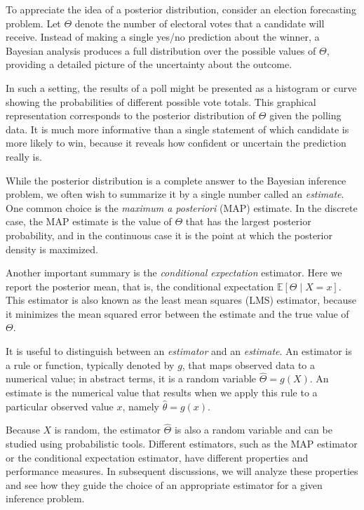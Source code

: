 To appreciate the idea of a posterior distribution, consider an election forecasting problem.  
Let \(\Theta\) denote the number of electoral votes that a candidate will receive.  
Instead of making a single yes/no prediction about the winner, a Bayesian analysis produces a full distribution over the possible values of \(\Theta\), providing a detailed picture of the uncertainty about the outcome.  

In such a setting, the results of a poll might be presented as a histogram or curve showing the probabilities of different possible vote totals.  
This graphical representation corresponds to the posterior distribution of \(\Theta\) given the polling data.  
It is much more informative than a single statement of which candidate is more likely to win, because it reveals how confident or uncertain the prediction really is.  

While the posterior distribution is a complete answer to the Bayesian inference problem, we often wish to summarize it by a single number called an \textit{estimate}.  
One common choice is the \textit{maximum a posteriori} (MAP) estimate.  
In the discrete case, the MAP estimate is the value of \(\Theta\) that has the largest posterior probability, and in the continuous case it is the point at which the posterior density is maximized.  

Another important summary is the \textit{conditional expectation} estimator.  
Here we report the posterior mean, that is, the conditional expectation \(\mathbb{E}[\Theta \mid X = x]\).  
This estimator is also known as the least mean squares (LMS) estimator, because it minimizes the mean squared error between the estimate and the true value of \(\Theta\).  

It is useful to distinguish between an \textit{estimator} and an \textit{estimate}.  
An estimator is a rule or function, typically denoted by \(g\), that maps observed data to a numerical value; in abstract terms, it is a random variable \(\hat{\Theta} = g(X)\).  
An estimate is the numerical value that results when we apply this rule to a particular observed value \(x\), namely \(\hat{\theta} = g(x)\).  

Because \(X\) is random, the estimator \(\hat{\Theta}\) is also a random variable and can be studied using probabilistic tools.  
Different estimators, such as the MAP estimator or the conditional expectation estimator, have different properties and performance measures.  
In subsequent discussions, we will analyze these properties and see how they guide the choice of an appropriate estimator for a given inference problem.

